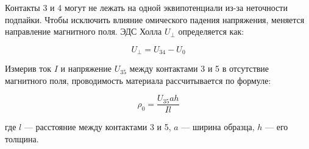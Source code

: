 Контакты 3 и 4 могут не лежать на одной эквипотенциали из-за неточности подпайки. Чтобы исключить влияние омического падения напряжения, меняется направление магнитного поля. ЭДС Холла \(U_\perp\) определяется как:

\begin{equation}
    U_\perp = U_{34} - U_0
\end{equation}

Измерив ток \( I \) и напряжение \( U_{35} \) между контактами 3 и 5 в отсутствие магнитного поля, проводимость материала рассчитывается по формуле:

\begin{equation}
    \rho_0 = \frac{U_{35} a h}{I l}
\end{equation}

где \( l \) — расстояние между контактами 3 и 5, \( a \) — ширина образца, \( h \) — его толщина.
